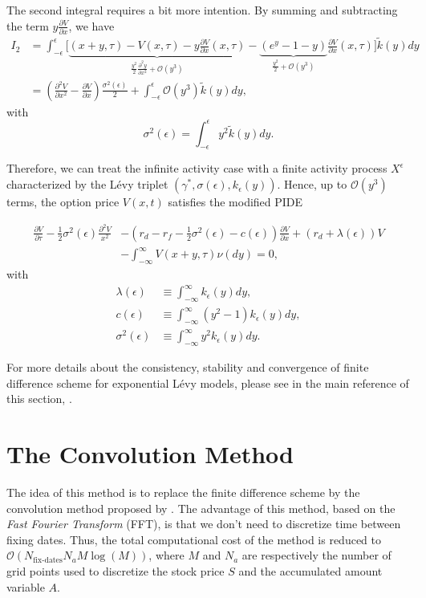 The second integral requires a bit more intention. By summing and subtracting the term $y\frac{\partial V}{\partial x}$, we have
\begin{align*}
I_2 &= \int_{-\epsilon}^{\epsilon}\Bigg[\underbrace{(x+y,\tau)-V(x,\tau)-y\frac{\partial V}{\partial x}(x,\tau)}_{\frac{y^2}{2}\frac{\partial^2y}{\partial x^2}+\mathcal{O}(y^3)}-\underbrace{\left(e^y-1-y\right)}_{\frac{y^2}{2}+\mathcal{O}(y^3)}\frac{\partial V}{\partial x}(x,\tau)\Bigg]\tilde{k}(y)dy\\
&=\left(\frac{\partial^2 V}{\partial x^2}-\frac{\partial V}{\partial x}\right)\frac{\sigma^2(\epsilon)}{2}+\int_{-\epsilon}^\epsilon \mathcal{O}(y^3)\tilde{k}(y)dy,
\end{align*}
with $$\sigma^2(\epsilon) = \int_{-\epsilon}^\epsilon y^2\tilde{k}(y)dy.$$

Therefore, we can treat the infinite activity case with a finite activity process $X^\epsilon$ characterized by the L\'evy triplet $(\gamma^\ast,\sigma(\epsilon),k_\epsilon(y))$. Hence, up to $\mathcal{O}(y^3)$ terms, the option price $V(x,t)$ satisfies the modified PIDE

\begin{align*}\frac{\partial V}{\partial \tau}-\frac{1}{2}\sigma^2(\epsilon)\frac{\partial^2V}{x^2}&-\left(r_d-r_f-\frac{1}{2}\sigma^2(\epsilon) -c(\epsilon)\right)\frac{\partial V}{\partial x}+(r_d +\lambda(\epsilon))V \\
&-\int_{-\infty}^\infty V(x+y,\tau)\nu(dy) = 0,
\end{align*}
with
\begin{align*}
\lambda(\epsilon) &\equiv \int_{-\infty}^\infty k_\epsilon(y)dy,\\
c(\epsilon) &\equiv \int_{-\infty}^\infty \left(y^2-1\right)k_\epsilon(y)dy,\\
\sigma^2(\epsilon) &\equiv \int_{-\infty}^\infty y^2 k_\epsilon(y)dy.
\end{align*}

For more details about the consistency, stability and convergence of finite difference scheme for exponential L\'evy models, please see in the main reference of this section, \citep{CV05}.

\section{The Convolution Method}
\label{sec:methods:conv}
The idea of this method is to replace the finite difference scheme by the convolution method proposed by \citeauthor{Lor+08} \citeyearpar{Lor+08}. The advantage of this method, based on the \textit{Fast Fourier Transform} (FFT), is that we don't need to discretize time between fixing dates. Thus, the total computational cost of the method is reduced to $\mathcal{O}(N_\text{fix-dates} N_a M \log(M))$, where $M$ and $N_a$ are respectively the number of grid points used to discretize the stock price $S$ and the accumulated amount variable $A$. 

